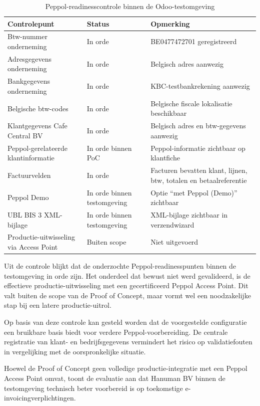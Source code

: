 \begin{table}[H]
\centering
\caption{Peppol-readinesscontrole binnen de Odoo-testomgeving}
\label{tab:peppol-readiness}
\begin{tabular}{|p{5cm}|p{3cm}|p{5cm}|}
\hline
\textbf{Controlepunt} & \textbf{Status} & \textbf{Opmerking} \\
\hline
Btw-nummer onderneming & In orde & BE0477472701 geregistreerd \\
\hline
Adresgegevens onderneming & In orde & Belgisch adres aanwezig \\
\hline
Bankgegevens onderneming & In orde & KBC-testbankrekening aanwezig \\
\hline
Belgische btw-codes & In orde & Belgische fiscale lokalisatie beschikbaar \\
\hline
Klantgegevens Cafe Central BV & In orde & Belgisch adres en btw-gegevens aanwezig \\
\hline
Peppol-gerelateerde klantinformatie & In orde binnen PoC & Peppol-informatie zichtbaar op klantfiche \\
\hline
Factuurvelden & In orde & Facturen bevatten klant, lijnen, btw, totalen en betaalreferentie \\
\hline
Peppol Demo & In orde binnen testomgeving & Optie ``met Peppol (Demo)'' zichtbaar \\
\hline
UBL BIS 3 XML-bijlage & In orde binnen testomgeving & XML-bijlage zichtbaar in verzendwizard \\
\hline
Productie-uitwisseling via Access Point & Buiten scope & Niet uitgevoerd \\
\hline
\end{tabular}
\end{table}

Uit de controle blijkt dat de onderzochte Peppol-readinesspunten binnen de testomgeving in orde zijn. Het onderdeel dat bewust niet werd gevalideerd, is de effectieve productie-uitwisseling met een gecertificeerd Peppol Access Point. Dit valt buiten de scope van de Proof of Concept, maar vormt wel een noodzakelijke stap bij een latere productie-uitrol.

Op basis van deze controle kan gesteld worden dat de voorgestelde configuratie een bruikbare basis biedt voor verdere Peppol-voorbereiding. De centrale registratie van klant- en bedrijfsgegevens vermindert het risico op validatiefouten in vergelijking met de oorspronkelijke situatie.

Hoewel de Proof of Concept geen volledige productie-integratie met een Peppol Access Point omvat, toont de evaluatie aan dat Hanuman BV binnen de testomgeving technisch beter voorbereid is op toekomstige e-invoicingverplichtingen.

